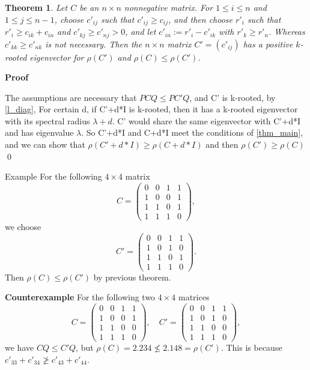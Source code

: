 \documentclass{article}
\theoremstyle{plain}
\newtheorem{thm}{Theorem}[section]
\theoremstyle{definition}
\begin{document}
\begin{thm}
Let $C$ be an $n\times n$ nonnegative matrix. For $1\leq i \leq n$ and $1\leq j\leq n-1$, choose $c'_{ij}$
such that $c'_{ij}\geq c_{ij}$, and then choose $r'_i$ such that $r'_i\geq c_{ik}+c_{in}$ and $c'_{kj}\geq c'_{nj}>0$, and 
let $c'_{in}:=r'_i-c'_{ik}$ with $r'_k \geq r'_n$. Whereas $c'_{kk}\geq c'_{nk}$ is not necessary. Then the $n\times n$ matrix $C'=(c'_{ij})$ has a positive $k$-rooted eigenvector for $\rho(C')$ and $\rho(C)\leq \rho(C')$. 
\end{thm}



{\bf Proof}

The assumptions are necessary that $PCQ \leq PC'Q$, and C' is k-rooted, by \ref{l_diag}, For certain d, if C'+d*I is k-rooted, then it has a k-rooted eigenvector with its spectral radius $\lambda + d$. C' would share the same eigenvector with C'+d*I and has eigenvalue $\lambda$. So C'+d*I and C+d*I meet the conditions of \ref{thm_main}, and we can show that $\rho(C' + d*I) \geq \rho(C +d*I)$ and then $\rho(C') \geq \rho(C)$  \qed



{Example}
For the following $4\times 4$ matrix
$$C=\begin{pmatrix}
0 & 0 & 1 & 1\\
1 & 0 & 0 & 1\\
1 & 1 & 0 & 1\\
1 & 1 & 1 & 0
\end{pmatrix},$$
we choose
$$C'=\begin{pmatrix}
0 & 0 & 1 & 1\\
1 & 0 & 1 &  0\\
1 & 1 & 0 & 1\\
1 & 1 & 1 & 0
\end{pmatrix}.$$
Then
$\rho(C)\leq \rho(C')$ by previous theorem.




{\bf Counterexample}
For the following two $4\times 4$ matrices
$$C=\begin{pmatrix}
0 & 0 & 1 & 1\\
1 & 0 & 0 & 1\\
1 & 1 & 0 & 0\\
1 & 1 & 1 & 0
\end{pmatrix},\quad C'=\begin{pmatrix}
0 & 0 & 1 & 1\\
1 & 0 & 1 &  0\\
1 & 1 & 0 & 0\\
1 & 1 & 1 & 0
\end{pmatrix},$$ 
we have $CQ\leq C'Q$, but 
$\rho(C)=2.234\not\leq 2.148= \rho(C')$. 
This is because $c'_{33}+c'_{34}\not\geq c'_{43}+c'_{44}$. 
\end{document}
